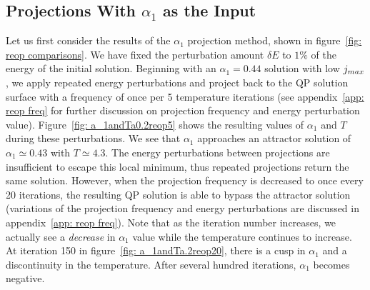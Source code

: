 \documentclass[../PhD.tex]{subfiles}
\begin{document}

\subsection{Projections With $\alpha_1$ as the Input}
\label{ssec: a1 projections}

Let us first consider the results of the $\alpha_1$ projection method, shown in figure~\ref{fig: reop comparisons}. We have fixed the perturbation amount $\delta E$ to $1\%$ of the energy of the initial solution. Beginning with an $\alpha_1 = 0.44$ solution with low $j_{max}$, we apply repeated energy perturbations and project back to the QP solution surface with a frequency of once per 5 temperature iterations (see appendix~\ref{app: reop freq} for further discussion  on projection frequency and energy perturbation value). Figure~\ref{fig: a_1andTa0.2reop5} shows the resulting values of $\alpha_1$ and $T$ during these perturbations. We see that $\alpha_1$ approaches an attractor solution of $\alpha_1 \simeq 0.43$ with $T \simeq 4.3$. The energy perturbations between projections are insufficient to escape this local minimum, thus repeated projections return the same solution. However, when the projection frequency is decreased to once every 20 iterations, the resulting QP solution is able to bypass the attractor solution (variations of the projection frequency and energy perturbations are discussed in appendix~\ref{app: reop freq}). Note that as the iteration number increases, we actually see a \emph{decrease} in $\alpha_1$ value while the temperature continues to increase. At iteration 150 in figure~\ref{fig: a_1andTa.2reop20}, there is a cusp in $\alpha_1$ and a discontinuity in the temperature. After several hundred iterations, $\alpha_1$ becomes negative.

\vspace{0.15in}
\end{document}
